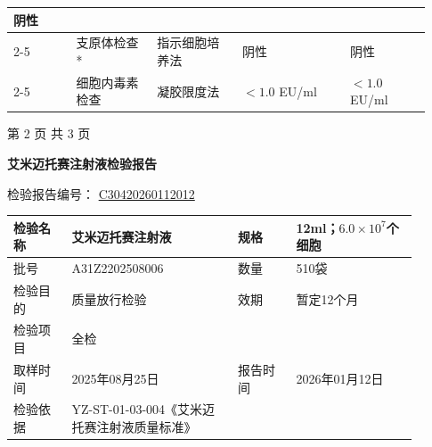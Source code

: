 \documentclass[UTF8,10pt,a4paper,fontset=fandol]{ctexart}
\newcommand{\fieldvalue}[1]{#1}
\begin{document}
\begin{tabular}{|p{0.14\linewidth}|p{0.18\linewidth}|p{0.19\linewidth}|p{0.24\linewidth}|p{0.18\linewidth}|}
\fieldvalue{阴性}
\\ \cline{2-5}
&
\fieldvalue{支原体检查*}
&
\fieldvalue{指示细胞培养法}
&
\fieldvalue{阴性}
&
\fieldvalue{阴性}
\\ \cline{2-5}
&
\fieldvalue{细胞内毒素检查}
&
\fieldvalue{凝胶限度法}
&
\fieldvalue{$<1.0$ EU/ml}
&
\fieldvalue{$<1.0$ EU/ml}
\\ \hline
\end{tabular}

\normalsize

\begin{center}
第 2 页 共 3 页
\end{center}


\newpage

\begin{center}
\textbf{艾米迈托赛注射液检验报告}
\end{center}

检验报告编号：
\fieldvalue{\underline{C30420260112012}}

\begin{tabular}{|p{0.13\linewidth}|p{0.37\linewidth}|p{0.13\linewidth}|p{0.27\linewidth}|}
\hline
检验名称 &
\fieldvalue{艾米迈托赛注射液} &
规格 &
\fieldvalue{12ml；$6.0\times10^{7}$个细胞}
\\ \hline
批号 &
\fieldvalue{A31Z2202508006} &
数量 &
\fieldvalue{510袋}
\\ \hline
检验目的 &
\fieldvalue{质量放行检验} &
效期 &
\fieldvalue{暂定12个月}
\\ \hline
检验项目 &
\fieldvalue{全检} &
\multicolumn{2}{l|}{}
\\ \hline
取样时间 &
\fieldvalue{2025年08月25日} &
报告时间 &
\fieldvalue{2026年01月12日}
\\ \hline
检验依据 &
\fieldvalue{YZ-ST-01-03-004《艾米迈托赛注射液质量标准》} &
\multicolumn{2}{l|}{}
\\ \hline
\end{tabular}
\end{document}
